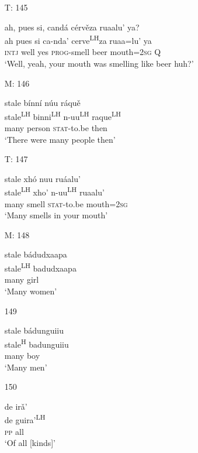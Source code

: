 \begin{itemize}
\item[T: 145]
 
\glll   ah, pues si, cand\'{a} c\'{e}rv\v{e}za ruaalu' ya?\\
ah pues si ca-nda'  cerve\textsuperscript{LH}za ruaa=lu' ya\\
\textsc{intj} well yes \textsc{prog}-smell  beer mouth=\textsc{2sg} \textsc{Q}\\
\glt `Well, yeah, your mouth was smelling like beer huh?'
 


\item[M: 146]
 
\glll   stale b\'{i}nn\'{i} n\'{u}u r\'{a}qu\v{e}\\
stale\textsuperscript{LH} binni\textsuperscript{LH} n-uu\textsuperscript{LH} raque\textsuperscript{LH}\\
many person \textsc{stat}-to.be then\\
\glt `There were many people then'
 

\item[T: 147]
  
\glll   stale xh\'{o} nuu ru\'{a}alu'\\
stale\textsuperscript{LH}  xho' n-uu\textsuperscript{LH} ruaalu'\\
many smell \textsc{stat}-to.be mouth=\textsc{2sg}\\
\glt `Many smells in your mouth'
 


\item[M: 148]
 
\glll   stale b\'{a}dudxaapa\\
stale\textsuperscript{LH} badudxaapa\\
many girl\\
\glt `Many women'
 


\item[149]
 
\glll   stale b\'{a}dunguiiu\\
stale\textsuperscript{H} badunguiiu\\
many boy\\
\glt `Many men'
 


\item[150]
 
\glll   de ir\v{a}'\\
de guira'\textsuperscript{LH}\\
\textsc{pp} all\\
\glt `Of all [kinds]' 
 




\end{itemize}

